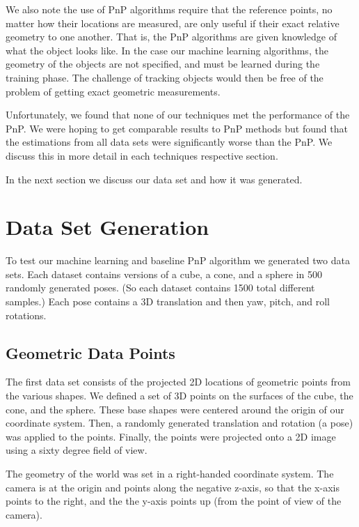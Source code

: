 \documentclass[journal]{IEEEtran}
\begin{document}
 We also note the use of PnP algorithms require that the reference points, no matter how their locations are measured, are only useful if their exact relative geometry to one another. That is, the PnP algorithms are given knowledge of what the object looks like. In the case our machine learning algorithms, the geometry of the objects are not specified, and must be learned during the training phase. The challenge of tracking objects would then be free of the problem of getting exact geometric measurements.
 
Unfortunately, we found that none of our techniques met the performance of the PnP.  We were hoping to get comparable results to PnP methods but found that the estimations from all data sets were significantly worse than the PnP. We discuss this in more detail in each techniques respective section.

In the next section we discuss our data set and how it was generated. 


\section{Data Set Generation}

To test our machine learning and baseline PnP algorithm we generated two data sets. Each dataset contains versions of a cube, a cone, and a sphere in 500 randomly generated poses. (So each dataset contains 1500 total different samples.) Each pose contains a 3D translation and then yaw, pitch, and roll rotations.

\subsection{Geometric Data Points}

The first data set consists of the projected 2D locations of geometric points from the various shapes. We defined a set of 3D points on the surfaces of the cube, the cone, and the sphere. These base shapes were centered around the origin of our coordinate system. Then, a randomly generated translation and rotation (a pose) was applied to the points. Finally, the points were projected onto a 2D image using a sixty degree field of view.

The geometry of the world was set in a right-handed coordinate system. The camera is at the origin and points along the negative z-axis, so that the x-axis points to the right, and the the y-axis points up (from the point of view of the camera).
\end{document}
